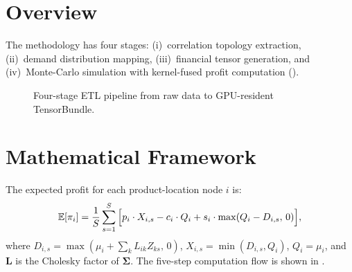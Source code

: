 \section{Overview}

The methodology has four stages: (i)~correlation topology extraction, (ii)~demand distribution mapping, (iii)~financial tensor generation, and (iv)~Monte-Carlo simulation with kernel-fused profit computation ().

\begin{figure}[H]
\centering
{}
\caption{Four-stage ETL pipeline from raw data to GPU-resident TensorBundle.}
\label{fig:pipeline}
\end{figure}

\section{Mathematical Framework}\label{sec:math}

The expected profit for each product-location node $i$ is:
\begin{equation}\label{eq:expected-profit}
    \mathbb{E}[\pi_i] = \frac{1}{S} \sum_{s=1}^{S} \Big[ p_i \cdot X_{i,s} - c_i \cdot Q_i + s_i \cdot \max(Q_i - D_{i,s},\, 0) \Big],
\end{equation}
where $D_{i,s} = \max(\mu_i + \sum_k L_{ik} Z_{ks},\, 0)$, $X_{i,s} = \min(D_{i,s}, Q_i)$, $Q_i = \mu_i$, and $\mathbf{L}$ is the Cholesky factor of $\bm{\Sigma}$. The five-step computation flow is shown in .


